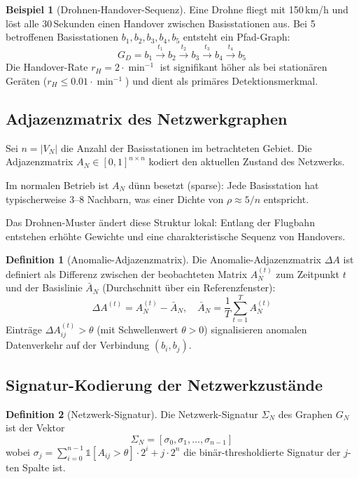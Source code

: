 ﻿\documentclass[a4paper,12pt]{article}
\theoremstyle{definition}
\newtheorem{definition}{Definition}
\newtheorem{beispiel}{Beispiel}
\begin{document}
\begin{beispiel}[Drohnen-Handover-Sequenz]
    Eine Drohne fliegt mit 150\,km/h und l\"ost alle 30\,Sekunden einen
    Handover zwischen Basisstationen aus. Bei 5 betroffenen Basisstationen
    $b_1, b_2, b_3, b_4, b_5$ entsteht ein Pfad-Graph:
    \[
    G_D = b_1 \xrightarrow{t_1} b_2 \xrightarrow{t_2} b_3 \xrightarrow{t_3}
          b_4 \xrightarrow{t_4} b_5
    \]
    Die Handover-Rate $r_H = 2 \cdot \min^{-1}$ ist signifikant h\"oher als
    bei station\"aren Ger\"aten ($r_H \leq 0.01 \cdot \min^{-1}$) und dient
    als prim\"ares Detektionsmerkmal.
\end{beispiel}

\subsection{Adjazenzmatrix des Netzwerkgraphen}

Sei $n = |V_N|$ die Anzahl der Basisstationen im betrachteten Gebiet.
Die Adjazenzmatrix $A_N \in [0,1]^{n \times n}$ kodiert den aktuellen
Zustand des Netzwerks.

Im normalen Betrieb ist $A_N$ d\"unn besetzt (sparse): Jede Basisstation hat
typischerweise 3--8 Nachbarn, was einer Dichte von $\rho \approx 5/n$ entspricht.

Das Drohnen-Muster \"andert diese Struktur lokal: Entlang der Flugbahn entstehen
erh\"ohte Gewichte und eine charakteristische Sequenz von Handovers.

\begin{definition}[Anomalie-Adjazenzmatrix]
\label{def:anom}
    Die Anomalie-Adjazenzmatrix $\Delta A$ ist definiert als Differenz zwischen
    der beobachteten Matrix $A_N^{(t)}$ zum Zeitpunkt $t$ und der Basislinie
    $\bar{A}_N$ (Durchschnitt \"uber ein Referenzfenster):
    \[
    \Delta A^{(t)} = A_N^{(t)} - \bar{A}_N, \quad \bar{A}_N = \frac{1}{T}\sum_{t=1}^{T} A_N^{(t)}
    \]
    Eintr\"age $\Delta A_{ij}^{(t)} > \theta$ (mit Schwellenwert $\theta > 0$)
    signalisieren anomalen Datenverkehr auf der Verbindung $(b_i, b_j)$.
\end{definition}

\subsection{Signatur-Kodierung der Netzwerkzust\"ande}

\begin{definition}[Netzwerk-Signatur]
\label{def:netzsigantur}
    Die Netzwerk-Signatur $\Sigma_N$ des Graphen $G_N$ ist der Vektor
    \[
    \Sigma_N = [\sigma_0, \sigma_1, \ldots, \sigma_{n-1}]
    \]
    wobei $\sigma_j = \sum_{i=0}^{n-1} \mathbb{1}[A_{ij} > \theta] \cdot 2^i + j \cdot 2^n$
    die bin\"ar-thresholdierte Signatur der $j$-ten Spalte ist.
\end{definition}
\end{document}
